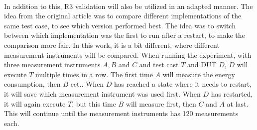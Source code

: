 

\paragraph*{}
In addition to this, R3 validation\cite*[]{Bokhari2020r3} will also be utilized in an adapted manner. The idea from the original article was to compare different implementations of the same test case, to see which version performed best. The idea was to switch between which implementation was the first to run after a restart, to make the comparison more fair. In this work, it is a bit different, where different measurement instruments will be compared. When running the experiment, with three measurement instruments $A, B$ and $C$ and test cast $T$ and DUT $D$, $D$ will execute $T$ multiple times in a row. The first time $A$ will measure the energy consumption, then $B$ ect.. When $D$ has reached a state where it needs to restart, it will save which measurement instrument was used first. When $D$ has restarted, it will again execute $T$, but this time $B$ will measure first, then $C$ and $A$ at last. This will continue until the measurement instruments has 120 measurements each.
